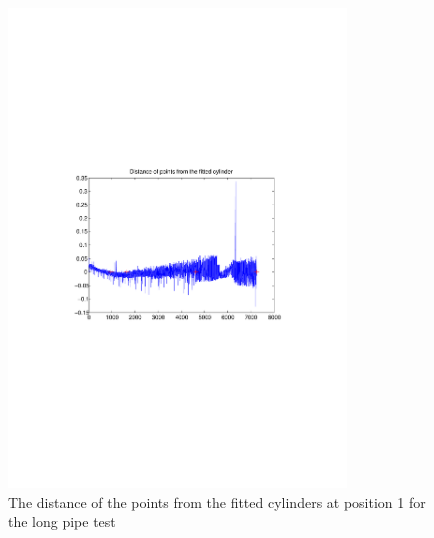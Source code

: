 \begin{figure}[htbp]
    \centering
    \includegraphics[width=0.8\textwidth]{pics/longpipe-tof-dist}
    \caption{The distance of the points from the fitted cylinders at position 1 for the
    long pipe test}
    \label{chap7:fig-longpipe-tof-dist}
\end{figure}
